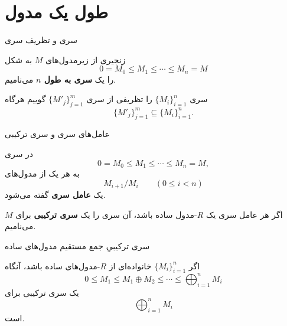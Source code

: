\section{طول یک مدول}

\begin{frame}[t]{سری و تظریف سری}
  \label{lec13:series-refinement}
  \begin{definition}[سری]
    زنجیری از زیرمدول‌های $M$ به شکل
    \[
      0=M_0\leqslant M_1\leqslant\cdots\leqslant M_n=M
    \]
    را یک \textbf{سری به طول $n$} می‌نامیم.
  \end{definition}
  \begin{definition}
    سری $\{M_i\}_{i=1}^{n}$ را تظریفی از سری
    $\{M'_j\}_{j=1}^{m}$ گوییم هرگاه
    \[
      \{M'_j\}_{j=1}^{m}\subseteq\{M_i\}_{i=1}^{n}.
    \]
  \end{definition}
\end{frame}

\begin{frame}[t]{عامل‌های سری و سری ترکیبی}
  \label{lec13:composition-series}
  \begin{definition}
    در سری
    \[
      0=M_0\leqslant M_1\leqslant\cdots\leqslant M_n=M,
    \]
    به هر یک از مدول‌های
    \[
      M_{i+1}/M_i\qquad(0\leqslant i<n)
    \]
    یک \textbf{عامل سری} گفته می‌شود.
  \end{definition}
  \begin{definition}
    اگر هر عامل سری یک $R$-مدول ساده باشد، آن سری را یک
    \textbf{سری ترکیبی} برای $M$ می‌نامیم.
  \end{definition}
\end{frame}

\begin{frame}[t]{سری ترکیبیِ جمع مستقیم مدول‌های ساده}
  \label{lec13:simple-sum-example}
  \begin{example}
    اگر $\{M_i\}_{i=1}^{n}$ خانواده‌ای از $R$-مدول‌های ساده باشد، آنگاه
    \[
      0\leqslant M_1\leqslant M_1\oplus M_2
      \leqslant\cdots\leqslant\bigoplus_{i=1}^{n}M_i
    \]
    یک سری ترکیبی برای
    \[
      \bigoplus_{i=1}^{n}M_i
    \]
    است.
  \end{example}
\end{frame}

